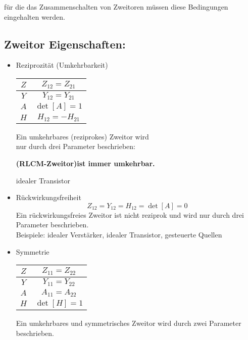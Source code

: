 für die das Zusammenschalten von Zweitoren müssen diese Bedingungen
eingehalten werden.

\subsection{Zweitor Eigenschaften:}
\begin{itemize}
    \item Reziprozit\"at (Umkehrbarkeit)
        \begin{center}
            \begin{tabular}{|c|c|}
                \hline
                $Z$&  $Z_{12} = Z_{21}$\\
                \hline
                $Y$&  $Y_{12} = Y_{21}$\\
                \hline
                $A$&  $\operatorname{det}[A] = 1$\\
                \hline
                $H$&  $H_{12} = -H_{21}$\\
                \hline
            \end{tabular}
        \end{center}
        Ein umkehrbares (reziprokes) Zweitor wird\\ nur durch drei Parameter
        beschrieben:

        \footnotesize
        \textbf{(RLCM-Zweitor)ist immer umkehrbar.}

        {\color{red}{Gegenbeispiel:}} idealer Transistor
        \normalsize
    \item R\"uckwirkungsfreiheit\\
        $$Z_{12}=Y_{12}=H_{12}=\operatorname{det}[A]=0$$
        Ein rückwirkungsfreies Zweitor ist nicht reziprok und wird nur durch
        drei Parameter beschrieben.\\
        \footnotesize
        Beispiele: idealer Verstärker, idealer Transistor, gesteuerte Quellen
        \normalsize
    \item Symmetrie
        \begin{center}
            \begin{tabular}{|c|c|}
                \hline
                $Z$&  $Z_{11} = Z_{22}$\\
                \hline
                $Y$&  $Y_{11} = Y_{22}$\\
                \hline
                $A$&  $A_{11} = A_{22}$\\
                \hline
                $H$&  $\operatorname{det}[H]=1$\\
                \hline
            \end{tabular}
        \end{center}
        Ein umkehrbares und symmetrisches Zweitor wird durch zwei Parameter
        beschrieben.
\end{itemize}
\newpage

